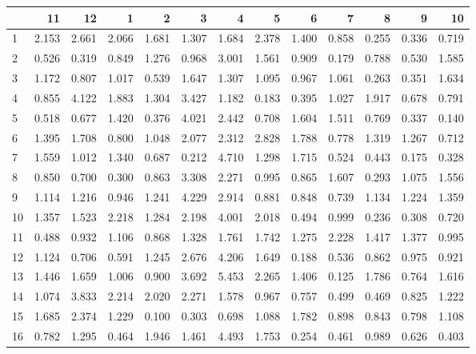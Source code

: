 \begin{tabular}{lrrrrrrrrrrrr}
\toprule
{} &     11 &     12 &     1  &     2  &     3  &     4  &     5  &     6  &     7  &     8  &     9  &     10 \\
\midrule
1   &  2.153 &  2.661 &  2.066 &  1.681 &  1.307 &  1.684 &  2.378 &  1.400 &  0.858 &  0.255 &  0.336 &  0.719 \\
2   &  0.526 &  0.319 &  0.849 &  1.276 &  0.968 &  3.001 &  1.561 &  0.909 &  0.179 &  0.788 &  0.530 &  1.585 \\
3   &  1.172 &  0.807 &  1.017 &  0.539 &  1.647 &  1.307 &  1.095 &  0.967 &  1.061 &  0.263 &  0.351 &  1.634 \\
4   &  0.855 &  4.122 &  1.883 &  1.304 &  3.427 &  1.182 &  0.183 &  0.395 &  1.027 &  1.917 &  0.678 &  0.791 \\
5   &  0.518 &  0.677 &  1.420 &  0.376 &  4.021 &  2.442 &  0.708 &  1.604 &  1.511 &  0.769 &  0.337 &  0.140 \\
6   &  1.395 &  1.708 &  0.800 &  1.048 &  2.077 &  2.312 &  2.828 &  1.788 &  0.778 &  1.319 &  1.267 &  0.712 \\
7   &  1.559 &  1.012 &  1.340 &  0.687 &  0.212 &  4.710 &  1.298 &  1.715 &  0.524 &  0.443 &  0.175 &  0.328 \\
8   &  0.850 &  0.700 &  0.300 &  0.863 &  3.308 &  2.271 &  0.995 &  0.865 &  1.607 &  0.293 &  1.075 &  1.556 \\
9   &  1.114 &  1.216 &  0.946 &  1.241 &  4.229 &  2.914 &  0.881 &  0.848 &  0.739 &  1.134 &  1.224 &  1.359 \\
10  &  1.357 &  1.523 &  2.218 &  1.284 &  2.198 &  4.001 &  2.018 &  0.494 &  0.999 &  0.236 &  0.308 &  0.720 \\
11  &  0.488 &  0.932 &  1.106 &  0.868 &  1.328 &  1.761 &  1.742 &  1.275 &  2.228 &  1.417 &  1.377 &  0.995 \\
12  &  1.124 &  0.706 &  0.591 &  1.245 &  2.676 &  4.206 &  1.649 &  0.188 &  0.536 &  0.862 &  0.975 &  0.921 \\
13  &  1.446 &  1.659 &  1.006 &  0.900 &  3.692 &  5.453 &  2.265 &  1.406 &  0.125 &  1.786 &  0.764 &  1.616 \\
14  &  1.074 &  3.833 &  2.214 &  2.020 &  2.271 &  1.578 &  0.967 &  0.757 &  0.499 &  0.469 &  0.825 &  1.222 \\
15  &  1.685 &  2.374 &  1.229 &  0.100 &  0.303 &  0.698 &  1.088 &  1.782 &  0.898 &  0.843 &  0.798 &  1.108 \\
16  &  0.782 &  1.295 &  0.464 &  1.946 &  1.461 &  4.493 &  1.753 &  0.254 &  0.461 &  0.989 &  0.626 &  0.403 \\

\end{tabular}
